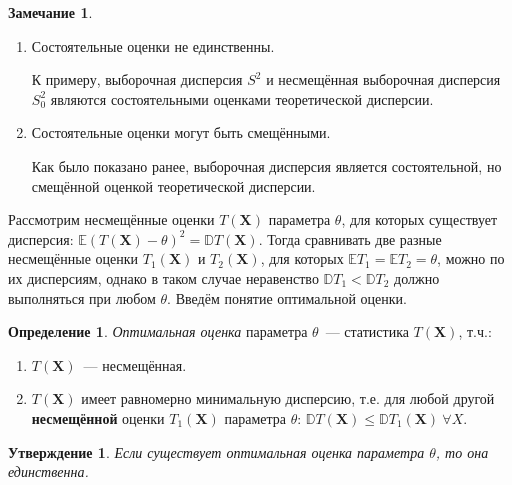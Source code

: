 \documentclass[oneside,final,14pt]{extreport}
\theoremstyle{plain}
\newtheorem*{thm*}{Утверждение}
\theoremstyle{definition}
\newtheorem*{defn}{Определение}
\newtheorem*{rmrk}{Замечание}
\theoremstyle{named}
\begin{document}
\begin{rmrk}
\begin{enumerate}
    \item Состоятельные оценки не единственны.
    
    К примеру, выборочная дисперсия $S^{2}$ и несмещённая выборочная дисперсия $S_0^{2}$ являются состоятельными оценками теоретической дисперсии.
    
    \item Состоятельные оценки могут быть смещёнными.
    
    Как было показано ранее, выборочная дисперсия является состоятельной, но смещённой оценкой теоретической дисперсии.
    
    \end{enumerate}
\end{rmrk}

Рассмотрим несмещённые оценки $T(\mathbf{X})$ параметра $\theta$, для которых существует дисперсия: $\mathbb{E}(T(\mathbf{X})-\theta)^{2}=\mathbb{D} T(\mathbf{X})$. Тогда сравнивать две разные несмещённые оценки $T_{1}(\mathbf{X})$ и $T_{2}(\mathbf{X})$, для которых $\mathbb{E}T_{1} = \mathbb{E}T_{2} = \theta$, можно по их дисперсиям, однако в таком случае неравенство $\mathbb{D} T_{1}<\mathbb{D} T_{2}$ должно выполняться при любом $\theta$. Введём понятие оптимальной оценки.
\begin{defn}
{\it Оптимальная оценка} параметра $\theta$~--- статистика $T(\mathbf{X})$, т.ч.:
\begin{enumerate}
    \item $T(\mathbf{X})$~--- несмещённая.
    \item $T(\mathbf{X})$ имеет равномерно минимальную дисперсию, т.е. для любой другой \textbf{несмещённой} оценки $T_{1}(\mathbf{X})$ параметра $\theta$: $\mathbb{D} T(\mathbf{X}) \leqslant \mathbb{D} T_{1}(\mathbf{X})~ \forall X$.
\end{enumerate}
\end{defn}

\begin{thm*}
Если существует оптимальная оценка параметра $\theta$, то она единственна.
\end{thm*}
\end{document}
